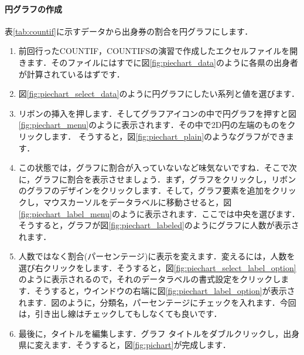 \paragraph{円グラフの作成}

表\ref{tab:countif}に示すデータから出身券の割合を円グラフにします．

\begin{enumerate}
    \item 前回行ったCOUNTIF，COUNTIFSの演習で作成したエクセルファイルを開きます．そのファイルにはすでに図\ref{fig:piechart_data}のように各県の出身者が計算されているはずです．
    \item 図\ref{fig:piechart_select_data}のように円グラフにしたい系列と値を選びます．
    \item リボンの挿入を押します．そしてグラフアイコンの中で円グラフを押すと図\ref{fig:piechart_menu}のように表示されます．その中で2D円の左端のものをクリックします．
    そうすると，図\ref{fig:piechart_plain}のようなグラフができます．
    \item この状態では，グラフに割合が入っていないなど味気ないですね．そこで次に，グラフに割合を表示させましょう．まず，グラフをクリックし，リボンのグラフのデザインをクリックします．そして，グラフ要素を追加をクリックし，マウスカーソルをデータラベルに移動させると，図\ref{fig:piechart_label_menu}のように表示されます．ここでは中央を選びます．そうすると，グラフが図\ref{fig:piechart_labeled}のようにグラフに人数が表示されます．
    \item 人数ではなく割合(パーセンテージ)に表示を変えます．変えるには，人数を選び右クリックをします．そうすると，図\ref{fig:piechart_select_label_option}のように表示されるので，それのデータラベルの書式設定をクリックします．そうすると，ウインドウの右端に図\ref{fig:piechart_label_option}が表示されます．図のように，分類名，パーセンテージにチェックを入れます．今回は，引き出し線はチェックしてもしなくても良いです．
    \item 最後に，タイトルを編集します．グラフ タイトルをダブルクリックし，出身県に変えます．そうすると，図\ref{fig:pichart}が完成します．
\end{enumerate}

